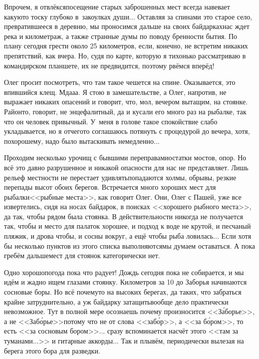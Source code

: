 Впрочем, я отвлёкся\mdash посещение старых заброшенных мест всегда навевает какую\sdash то тоску глубоко в~закоулках души$\ldots$ Оставляя за спинами это старое село, превратившееся в деревню, мы проносимся дальше на своих байдарках\mdash нас ждет река и километраж, а также странные думы по поводу бренности бытия. По плану сегодня грести около 25 километров, если, конечно, не встретим никаких препятствий, как вчера. Но, судя по карте, которую я тихонько рассматриваю в командирском планшете, их не предвидится, поэтому рвёмся вперёд!

Олег просит посмотреть, что там такое чешется на спине. Оказывается, это впившийся клещ. Мда\sdash а\sdash а. Я стою в замешательстве, а Олег, напротив, не выражает никаких опасений и говорит, что, мол, вечером вытащим, на стоянке. Район\sdash то, говорит, не энцефалитный, да и кусали его много раз на рыбалке, так что он человек привычный. У~меня в голове такое спокойствие слабо укладывается, но я отчего\sdash то соглашаюсь потянуть с процедурой до вечера, хотя, по\sdash хорошему, надо было вытаскивать немедленно$\ldots$

Проходим несколько урочищ с бывшими переправами\mdash остатки мостов, опор. Но всё это давно разрушенное и никакой опасности для нас не представляет. Лишь рельеф местности не перестает удивлять\mdash попадаются холмы, обрывы, резкие перепады высот обоих берегов. Встречается много хороших мест для рыбалки\mdash <<рыбные места>>, как говорит Олег. Они, Олег с Пашей, уже все извертелись, сидя на носах байдарок, в поисках <<хорошего рыбного места>>, да так, чтобы рядом была стоянка. В действительности никогда не получается так, чтобы и место для палаток хорошее, и подход к воде не крутой, и песчаный пляжик, и дрова чтобы, и сосны вокруг, а ещё чтобы рыба ловилась$\ldots$ Если хотя бы несколько пунктов из этого списка выполняются\mdash мы думаем оставаться. А пока гребём дальше\mdash мест для стоянок категорически нет.

Одно хорошо\mdash погода пока что радует! Дождь сегодня пока не собирается, и мы идём и жадно ищем глазами стоянку. Километров за 10 до Заборья начинаются сосновые боры. Но всё почему\sdash то на высоких берегах, да таких, что забраться крайне затруднительно, а уж байдарку затащить\mdash вообще дело практически невозможное. Тут в полной мере осознаешь почему произносится <<З\'{а}борье>>, а не <<Заб\'{о}рье>>\mdash потому что не от слова <<заб\'{о}р>>, а <<за б\'{о}ром>>, то есть <<за сосновым бором>>$\ldots$ сразу вспоминается насчёт этого <<там за туманами$\ldots$>> и гитарные аккорды$\ldots$ Так и плывём, периодически вылезая на берега этого бора для разведки.

